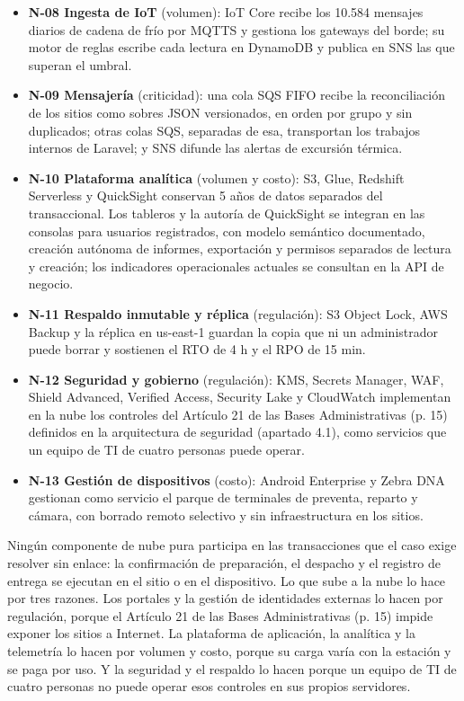 \begin{itemize}
  \item \textbf{N-08 Ingesta de IoT} (volumen): IoT Core recibe los 10.584 mensajes diarios de cadena de frío por MQTTS y gestiona los gateways del borde; su motor de reglas escribe cada lectura en DynamoDB y publica en SNS las que superan el umbral.
  \item \textbf{N-09 Mensajería} (criticidad): una cola SQS FIFO recibe la reconciliación de los sitios como sobres JSON versionados, en orden por grupo y sin duplicados; otras colas SQS, separadas de esa, transportan los trabajos internos de Laravel; y SNS difunde las alertas de excursión térmica.
  \item \textbf{N-10 Plataforma analítica} (volumen y costo): S3, Glue, Redshift Serverless y QuickSight conservan 5 años de datos separados del transaccional. Los tableros y la autoría de QuickSight se integran en las consolas para usuarios registrados, con modelo semántico documentado, creación autónoma de informes, exportación y permisos separados de lectura y creación; los indicadores operacionales actuales se consultan en la API de negocio.
  \item \textbf{N-11 Respaldo inmutable y réplica} (regulación): S3 Object Lock, AWS Backup y la réplica en us-east-1 guardan la copia que ni un administrador puede borrar y sostienen el RTO de 4 h y el RPO de 15 min.
  \item \textbf{N-12 Seguridad y gobierno} (regulación): KMS, Secrets Manager, WAF, Shield Advanced, Verified Access, Security Lake y CloudWatch implementan en la nube los controles del Artículo 21 de las Bases Administrativas (p. 15) definidos en la arquitectura de seguridad (apartado 4.1), como servicios que un equipo de TI de cuatro personas puede operar.
  \item \textbf{N-13 Gestión de dispositivos} (costo): Android Enterprise y Zebra DNA gestionan como servicio el parque de terminales de preventa, reparto y cámara, con borrado remoto selectivo y sin infraestructura en los sitios.
\end{itemize}

Ningún componente de nube pura participa en las transacciones que el caso exige resolver sin enlace: la confirmación de preparación, el despacho y el registro de entrega se ejecutan en el sitio o en el dispositivo. Lo que sube a la nube lo hace por tres razones. Los portales y la gestión de identidades externas lo hacen por regulación, porque el Artículo 21 de las Bases Administrativas (p. 15) impide exponer los sitios a Internet. La plataforma de aplicación, la analítica y la telemetría lo hacen por volumen y costo, porque su carga varía con la estación y se paga por uso. Y la seguridad y el respaldo lo hacen porque un equipo de TI de cuatro personas no puede operar esos controles en sus propios servidores.

